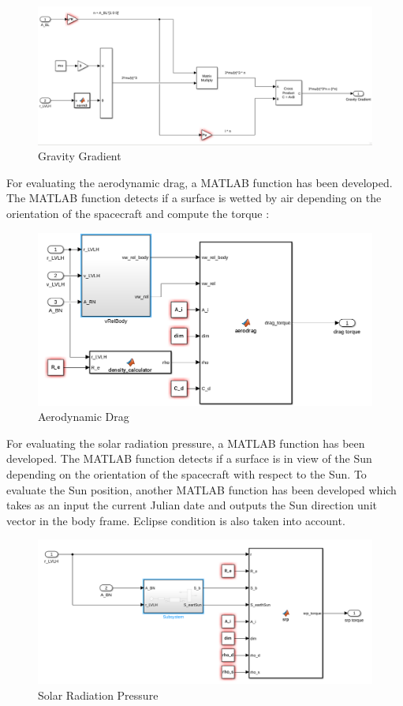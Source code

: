\documentclass[11pt,a4paper]{report}
\begin{document}
\begin{figure}[H]
 \centering
 \includegraphics[scale=0.4]{gfx/simulink/gravitygradient.png}
 \caption{Gravity Gradient} 
 \label{fig:gravitygradient}
\end{figure}

For evaluating the aerodynamic drag, a MATLAB function has been developed. The MATLAB function detects if a surface is wetted by air depending on the orientation of the spacecraft and compute the torque :

\begin{figure}[H]
 \centering
 \includegraphics[scale=0.4]{gfx/simulink/aerodrag.png}
 \caption{Aerodynamic Drag} 
 \label{fig:aerodrag}
\end{figure}

For evaluating the solar radiation pressure, a MATLAB function has been developed. The MATLAB function detects if a surface is in view of the Sun depending on the orientation of the spacecraft with respect to the Sun. To evaluate the Sun position, another MATLAB function has been developed which takes as an input the current Julian date and outputs the Sun direction unit vector in the body frame. 
Eclipse condition is also taken into account.

\begin{figure}[H]
 \centering
 \includegraphics[scale=0.4]{gfx/simulink/srp.png}
 \caption{Solar Radiation Pressure} 
 \label{fig:srp}
\end{figure}
\end{document}
